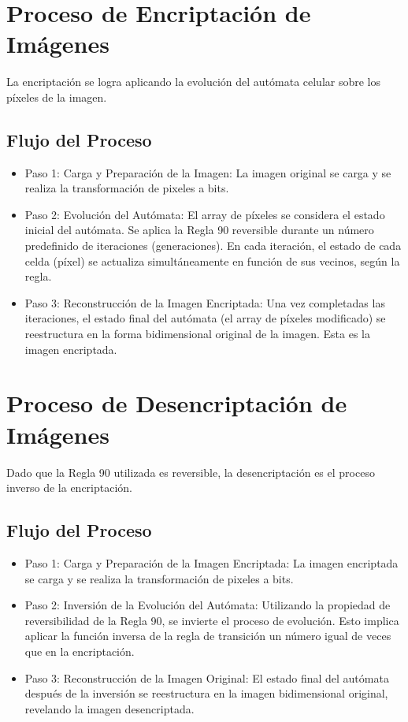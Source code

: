 \section{Proceso de Encriptación de Imágenes}
La encriptación se logra aplicando la evolución del autómata celular sobre los píxeles de la imagen.

\subsection{Flujo del Proceso}
\begin{itemize}
\item Paso 1: Carga y Preparación de la Imagen: La imagen original se carga y se realiza la transformación de pixeles a bits.
\item Paso 2: Evolución del Autómata: El array de píxeles se considera el estado inicial del autómata. Se aplica la Regla 90 reversible durante un número predefinido de iteraciones (generaciones). En cada iteración, el estado de cada celda (píxel) se actualiza simultáneamente en función de sus vecinos, según la regla.
\item Paso 3: Reconstrucción de la Imagen Encriptada: Una vez completadas las iteraciones, el estado final del autómata (el array de píxeles modificado) se reestructura en la forma bidimensional original de la imagen. Esta es la imagen encriptada.
\end{itemize}

\section{Proceso de Desencriptación de Imágenes}
Dado que la Regla 90 utilizada es reversible, la desencriptación es el proceso inverso de la encriptación.

\subsection{Flujo del Proceso}
\begin{itemize}
\item Paso 1: Carga y Preparación de la Imagen Encriptada: La imagen encriptada se carga y se realiza la transformación de pixeles a bits.
\item Paso 2: Inversión de la Evolución del Autómata: Utilizando la propiedad de reversibilidad de la Regla 90, se invierte el proceso de evolución. Esto implica aplicar la función inversa de la regla de transición un número igual de veces que en la encriptación.
\item Paso 3: Reconstrucción de la Imagen Original: El estado final del autómata después de la inversión se reestructura en la imagen bidimensional original, revelando la imagen desencriptada.
\end{itemize}
